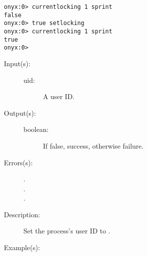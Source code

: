 \begin{description}
\begin{description}
\begin{verbatim}
onyx:0> currentlocking 1 sprint
false
onyx:0> true setlocking
onyx:0> currentlocking 1 sprint
true
onyx:0>
		\end{verbatim}
	\end{description}
\label{systemdict:setuid}
\item[{\onyxop{uid}{setuid}{boolean}}: ]
	\begin{description}\item[]
	\item[Input(s): ]
		\begin{description}\item[]
		\item[uid: ]
			A user ID.
		\end{description}
	\item[Output(s): ]
		\begin{description}\item[]
		\item[boolean: ]
			If false, success, otherwise failure.
		\end{description}
	\item[Errors(s): ]
		\begin{description}\item[]
		\item[.]
		\item[.]
		\item[.]
		\end{description}
	\item[Description: ]
		Set the process's user ID to .
	\item[Example(s): ]\begin{verbatim}


\end{verbatim}
\end{description}
\end{description}
